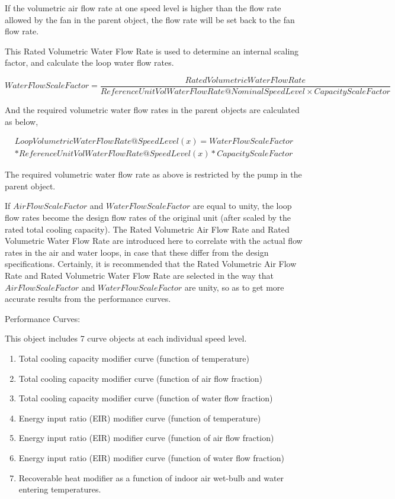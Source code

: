 If the volumetric air flow rate at one speed level is higher than the flow rate allowed by the fan in the parent object, the flow rate will be set back to the fan flow rate.

This Rated Volumetric Water Flow Rate is used to determine an internal scaling factor, and calculate the loop water flow rates.

{\scriptsize
\begin{equation}
  WaterFlowScaleFactor = \frac{{RatedVolumetricWaterFlowRate}}{{ReferenceUnitVolWaterFlowRate@NominalSpeedLevel \times CapacityScaleFactor}}
\end{equation}}

And the required volumetric water flow rates in the parent objects are calculated as below,

\begin{equation}
\begin{split}
  LoopVolumetricWaterFlowRate@SpeedLevel\left( x \right) = WaterFlowScaleFactor \\
  * ReferenceUnitVolWaterFlowRate@SpeedLevel(x) * CapacityScaleFactor
\end{split}
\end{equation}

The required volumetric water flow rate as above is restricted by the pump in the parent object.

If \(AirFlowScaleFactor\) and \(WaterFlowScaleFactor\) are equal to unity, the loop flow rates become the design flow rates of the original unit (after scaled by the rated total cooling capacity). The Rated Volumetric Air Flow Rate and Rated Volumetric Water Flow Rate are introduced here to correlate with the actual flow rates in the air and water loops, in case that these differ from the design specifications. Certainly, it is recommended that the Rated Volumetric Air Flow Rate and Rated Volumetric Water Flow Rate are selected in the way that \(AirFlowScaleFactor\) and \(WaterFlowScaleFactor\) are unity, so as to get more accurate results from the performance curves.

Performance Curves:

This object includes 7 curve objects at each individual speed level.

\begin{enumerate}
\def\labelenumi{\arabic{enumi})}
\item
  Total cooling capacity modifier curve (function of temperature)
\item
  Total cooling capacity modifier curve (function of air flow fraction)
\item
  Total cooling capacity modifier curve (function of water flow fraction)
\item
  Energy input ratio (EIR) modifier curve (function of temperature)
\item
  Energy input ratio (EIR) modifier curve (function of air flow fraction)
\item
  Energy input ratio (EIR) modifier curve (function of water flow fraction)
\item
  Recoverable heat modifier as a function of indoor air wet-bulb and water entering temperatures.
\end{enumerate}

